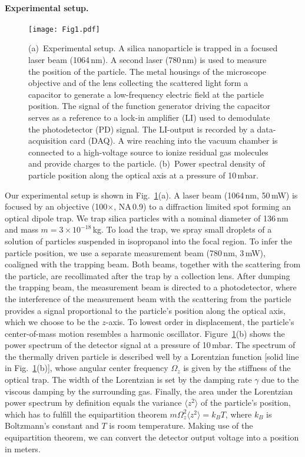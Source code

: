 \documentclass[aps,amssymb,amsmath,pra,reprint,noshowpacs]{revtex4-1}
\newcommand{\figwidth}{0.9\columnwidth} %
\begin{document}
\paragraph{Experimental setup.}
\begin{figure}
\texttt{[image: Fig1.pdf]}
\caption{(a)~Experimental setup. A silica nanoparticle is trapped in a focused laser beam (1064\,nm). A second laser (780\,nm) is used to measure the position of the particle. The metal housings of the microscope objective and of the lens collecting the scattered light form a capacitor to generate a low-frequency electric field at the particle position. The signal of the function generator driving the capacitor serves as a reference to a lock-in amplifier (LI) used to demodulate the photodetector (PD) signal. The LI-output is recorded by a data-acquisition card (DAQ). A wire reaching into the vacuum chamber is connected to a high-voltage source to ionize residual gas molecules and provide charges to the particle.
(b)~Power spectral density of particle position along the optical axis at a pressure of 10\,mbar.
}
\label{fig:setup}
\end{figure}
Our experimental setup is shown in Fig.~\ref{fig:setup}(a). A laser beam (1064\,nm, 50\,mW) is focused by an objective (100$\times$, NA\,0.9) to a diffraction limited spot forming an optical dipole trap. We trap silica particles with a nominal diameter of 136\,nm and mass $m=3\times10^{-18}$\,kg. To load the trap, we spray small droplets of a solution of particles suspended in isopropanol into the focal region. To infer the particle position, we use a separate measurement beam (780\,nm, 3\,mW), coaligned with the trapping beam. Both beams, together with the scattering from the particle, are recollimated after the trap by a collection lens. After dumping the trapping beam, the measurement beam is directed to a photodetector, where the interference of the measurement beam with the scattering from the particle provides a signal proportional to the particle's position along the optical axis, which we choose to be the $z$-axis. To lowest order in displacement, the particle's center-of-mass motion resembles a harmonic oscillator. Figure~\ref{fig:setup}(b) shows the power spectrum of the detector signal at a pressure of 10\,mbar.  The spectrum of the thermally driven particle is described well by a Lorentzian function [solid line in Fig.~\ref{fig:setup}(b)], whose {angular} center frequency $\Omega_z$ is given by the stiffness of the optical trap. The width of the Lorentzian is set by the damping rate $\gamma$ due to the viscous damping by the surrounding gas. Finally, the area under the Lorentzian power spectrum by definition equals the variance $\langle z^2\rangle$ of the particle's position, which has to fulfill the equipartition theorem $m\Omega_z^2\langle z^2\rangle=k_BT$, where $k_B$ is Boltzmann's constant and $T$ is room temperature. Making use of the equipartition theorem, we can convert the detector output voltage into a position in meters.
\end{document}
